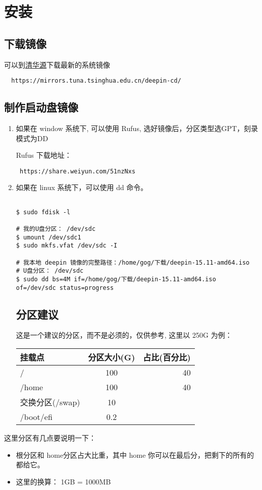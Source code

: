 \setcounter{page}{1} %
\section{安装}
\subsection{下载镜像}
可以到\href{https://mirrors.tuna.tsinghua.edu.cn/deepin-cd/}{清华源}下载最新的系统镜像

\begin{verbatim}
  https://mirrors.tuna.tsinghua.edu.cn/deepin-cd/
\end{verbatim}
  
\subsection{制作启动盘镜像}
\flushleft
\begin{enumerate}
\item 如果在 window 系统下, 可以使用 Rufus, 选好镜像后，分区类型选GPT，刻录模式为DD

Rufus 下载地址：\\
\begin{lstlisting}
 https://share.weiyun.com/51nzNxs
\end{lstlisting}
\item 如果在 linux 系统下，可以使用 dd 命令。
\begin{lstlisting}

$ sudo fdisk -l 

# 我的U盘分区： /dev/sdc
$ umount /dev/sdc1
$ sudo mkfs.vfat /dev/sdc -I

# 我本地 deepin 镜像的完整路径：/home/gog/下载/deepin-15.11-amd64.iso 
# U盘分区： /dev/sdc
$ sudo dd bs=4M if=/home/gog/下载/deepin-15.11-amd64.iso of=/dev/sdc status=progress
\end{lstlisting}

\subsection{分区建议}
这是一个建议的分区，而不是必须的，仅供参考, 这里以 250G 为例：


\begin{tabular}{|l|c|r|}
\hline
 挂载点 & 分区大小(G) & 占比(百分比)\\
\hline
   / & 100 & 40 \\      
\hline
   /home & 100 & 40 \\      
\hline
  交换分区(/swap) & 10 & \\
\hline
  /boot/efi & 0.2 & \\
\hline

\end{tabular}
\end{enumerate}


\setlength\parindent{2em}这里分区有几点要说明一下：

\begin{itemize}
\item 根分区和 home分区占大比重，其中 home 你可以在最后分，把剩下的所有的都给它。
\item 这里的换算： 1GB = 1000MB  
\end{itemize}